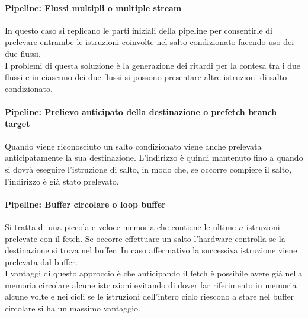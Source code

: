 \documentclass[12pt]{report}
\begin{document}
\paragraph{Pipeline: Flussi multipli o multiple stream} In questo caso si replicano le parti iniziali della pipeline per consentirle di prelevare entrambe le istruzioni coinvolte nel salto condizionato facendo uso dei due flussi. \\
I problemi di questa soluzione è la generazione dei ritardi per la contesa tra i due flussi e in ciascuno dei due flussi si possono presentare altre istruzioni di salto condizionato.
\paragraph{Pipeline: Prelievo anticipato della destinazione o prefetch branch target} Quando viene riconosciuto un salto condizionato viene anche prelevata anticipatamente la sua destinazione. L'indirizzo è quindi mantenuto fino a quando si dovrà eseguire l'istruzione di salto, in modo che, se occorre compiere il salto, l'indirizzo è già stato prelevato.
\paragraph{Pipeline: Buffer circolare o loop buffer} Si tratta di una piccola e veloce memoria che contiene le ultime $n$ istruzioni prelevate con il fetch. Se occorre effettuare un salto l'hardware controlla se la destinazione si trova nel buffer. In caso affermativo la successiva istruzione viene prelevata dal buffer. \\
I vantaggi di questo approccio è che anticipando il fetch è possibile avere già nella memoria circolare alcune istruzioni evitando di dover far riferimento in memoria alcune volte e nei cicli se le istruzioni dell'intero ciclo riescono a stare nel buffer circolare si ha un massimo vantaggio.
\end{document}
